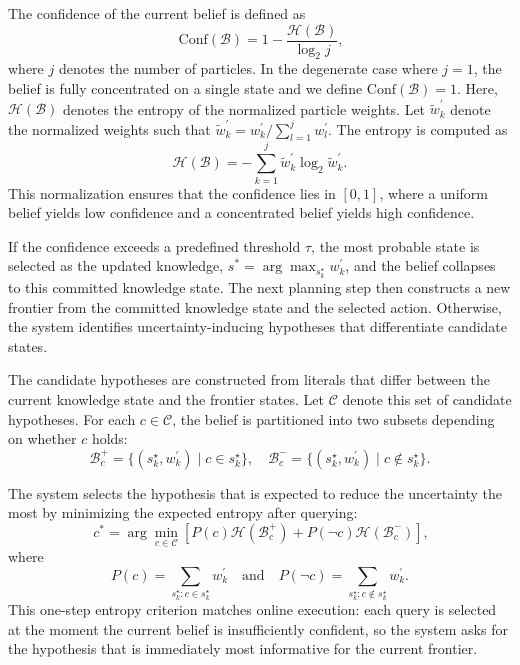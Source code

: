 The confidence of the current belief is defined as
\begin{equation}~\label{eq:compute_confidence}
\mathrm{Conf}(\mathcal{B}) = 1 - \frac{\mathcal{H}(\mathcal{B})}{\log_2 j},
\end{equation}
where $j$ denotes the number of particles. In the degenerate case where $j=1$, the belief is fully concentrated on a single state and we define $\mathrm{Conf}(\mathcal{B}) = 1$. Here, $\mathcal{H}(\mathcal{B})$ denotes the entropy of the normalized particle weights. Let $\tilde{w}_k^\prime$ denote the normalized weights such that $\tilde{w}_k^\prime = {w_k^\prime}/{\sum_{l=1}^{j} w_l^\prime}$. The entropy is computed as
\[
\mathcal{H}(\mathcal{B}) = - \sum_{k=1}^{j} \tilde{w}_k^\prime \log_2 \tilde{w}_k^\prime.
\]
This normalization ensures that the confidence lies in $[0,1]$, where a uniform belief yields low confidence and a concentrated belief yields high confidence.

If the confidence exceeds a predefined threshold $\tau$, the most probable state is selected as the updated knowledge, $s^{*} = \arg\max_{s_k^{\star}} w_k^\prime$, and the belief collapses to this committed knowledge state. The next planning step then constructs a new frontier from the committed knowledge state and the selected action. Otherwise, the system identifies uncertainty-inducing hypotheses that differentiate candidate states.

The candidate hypotheses are constructed from literals that differ between the current knowledge state and the frontier states. Let $\mathcal{C}$ denote this set of candidate hypotheses. For each $c \in \mathcal{C}$, the belief is partitioned into two subsets depending on whether $c$ holds:
$$
\mathcal{B}^{+}_{c} = \{(s_k^{\star}, w_k^\prime) \mid c \in s_k^{\star}\},
\quad
\mathcal{B}^{-}_{c} = \{(s_k^{\star}, w_k^\prime) \mid c \notin s_k^{\star}\}.
$$


The system selects the hypothesis that is expected to reduce the uncertainty the most by minimizing the expected entropy after querying:
\begin{equation}~\label{eq:select_hypo}
c^{*} = \arg\min_{c \in \mathcal{C}}
\left[
P(c)\mathcal{H}(\mathcal{B}^{+}_{c}) +
P(\neg c)\mathcal{H}(\mathcal{B}^{-}_{c})
\right],
\end{equation}
where 
\[P(c)=\sum_{s_k^{\star}: c \in s_k^{\star}} w_k^\prime \quad \text{and} \quad P(\neg c)=\sum_{s_k^{\star}: c \notin s_k^{\star}} w_k^\prime.\]
This one-step entropy criterion matches online execution: each query is selected at the moment the current belief is insufficiently confident, so the system asks for the hypothesis that is immediately most informative for the current frontier.

